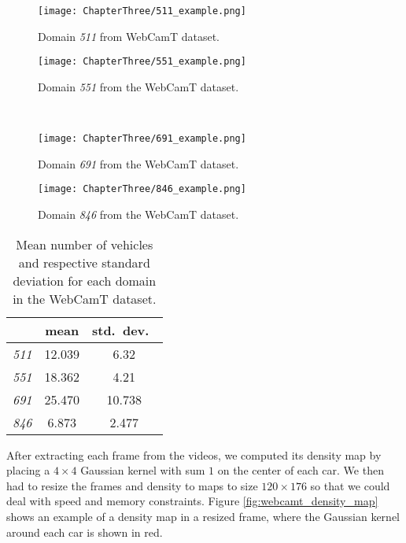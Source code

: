 \begin{figure}[!ht]
	\centering
	\begin{minipage}[b]{0.4\textwidth}
		\texttt{[image: ChapterThree/511\_example.png]}
		\caption{Domain \textit{511} from WebCamT dataset.}
		\label{fig:webcamt_511}
	\end{minipage}
	\hfill
	\begin{minipage}[b]{0.4\textwidth}
		\texttt{[image: ChapterThree/551\_example.png]}
		\caption{Domain \textit{551} from the WebCamT dataset.}
		\label{fig:webcamt_551}
	\end{minipage} \\
	\vspace{1cm}
	\begin{minipage}[b]{0.4\textwidth}
		\texttt{[image: ChapterThree/691\_example.png]}
		\caption{Domain \textit{691} from the WebCamT dataset.}
		\label{fig:webcamt_691}
	\end{minipage}
	\hfill
	\begin{minipage}[b]{0.4\textwidth}
		\texttt{[image: ChapterThree/846\_example.png]}
		\caption{Domain \textit{846} from the WebCamT dataset.}
		\label{fig:webcamt_846}
	\end{minipage}
\end{figure}

\begin{table}[!ht]
	\centering
	\begin{tabular}{c| c c}
		 & mean & std.\ dev.\  \\
		\hline
		\textit{511} & 12.039 & 6.32 \\
		\textit{551} & 18.362 & 4.21 \\
		\textit{691} & 25.470 & 10.738 \\
		\textit{846} & 6.873 & 2.477 \\
	\end{tabular}
	\caption{Mean number of vehicles and respective standard deviation for each domain in the WebCamT dataset.}
	\label{tab:webcamt_domains}
\end{table}

After extracting each frame from the videos, we computed its density map by placing a $4\times4$ Gaussian kernel with sum $1$ on the center of each car. We then had to resize the frames and density to maps to size $120\times 176$ so that we could deal with speed and memory constraints. Figure \ref{fig:webcamt_density_map} shows an example of a density map in a resized frame, where the Gaussian kernel around each car is shown in red.

